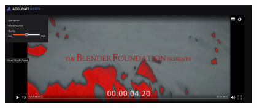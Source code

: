 \documentclass[../MasterThesis.tex]{subfiles}
\begin{document}
\begin{center}
	\includegraphics[width=0.8\textwidth]{ap_red.png}
\end{center}




	
	
	
\end{document}
